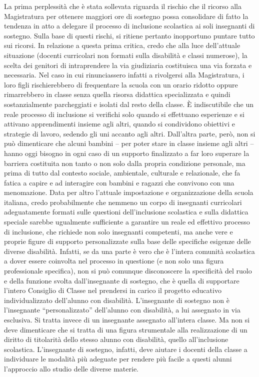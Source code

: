 La prima perplessità che è stata sollevata riguarda il rischio che il ricorso alla Magistratura per ottenere maggiori ore di sostegno possa consolidare di fatto la tendenza in atto a delegare il processo di inclusione scolastica ai soli insegnanti di sostegno. Sulla base di questi rischi, si ritiene pertanto inopportuno puntare tutto sui ricorsi.
In relazione a questa prima critica, credo che alla luce dell'attuale situazione (docenti curricolari non formati sulla disabilità e classi numerose), la scelta dei genitori di intraprendere la via giudiziaria costituisca una via forzata e necessaria. Nel caso in cui rinunciassero infatti a rivolgersi alla Magistratura, i loro figli rischierebbero di frequentare la scuola con un orario ridotto oppure rimarrebbero in classe senza quella risorsa didattica specializzata e quindi sostanzialmente parcheggiati e isolati dal resto della classe.
È indiscutibile che un reale processo di inclusione si verifichi solo quando si effettuano esperienze e si attivano apprendimenti insieme agli altri, quando si condividono obiettivi e strategie di lavoro, sedendo gli uni accanto agli altri. Dall'altra parte, però, non si può dimenticare che alcuni bambini – per poter stare in classe insieme agli altri – hanno oggi bisogno in ogni caso di un supporto finalizzato a far loro superare la barriera costituita non tanto o non solo dalla propria condizione personale, ma prima di tutto dal contesto sociale, ambientale, culturale e relazionale, che fa fatica a capire e ad interagire con bambini e ragazzi che convivono con una menomazione.
Data per altro l'attuale impostazione e organizzazione della scuola italiana, credo probabilmente che nemmeno un corpo di insegnanti curricolari adeguatamente formati sulle questioni dell'inclusione scolastica e sulla didattica speciale sarebbe ugualmente sufficiente a garantire un reale ed effettivo processo di inclusione, che richiede non solo insegnanti competenti, ma anche vere e proprie figure di supporto personalizzate sulla base delle specifiche esigenze delle diverse disabilità.
Infatti, se da una parte è vero che è l'intera comunità scolastica a dover essere coinvolta nel processo in questione (e non solo una figura professionale specifica), non si può comunque disconoscere la specificità del ruolo e della funzione svolta dall'insegnante di sostegno, che è quella di supportare l'intero Consiglio di Classe nel prendersi in carico il progetto educativo individualizzato dell'alunno con disabilità.
L'insegnante di sostegno non è l'insegnante “personalizzato” dell'alunno con disabilità, a lui assegnato in via esclusiva. Si tratta invece di un insegnante assegnato all'intera classe. Ma non si deve dimenticare che si tratta di una figura strumentale alla realizzazione di un diritto di titolarità dello stesso alunno con disabilità, quello all'inclusione scolastica. L'insegnante di sostegno, infatti, deve aiutare i docenti della classe a individuare le modalità più adeguate per rendere più facile a questi alunni l'approccio allo studio delle diverse materie.

